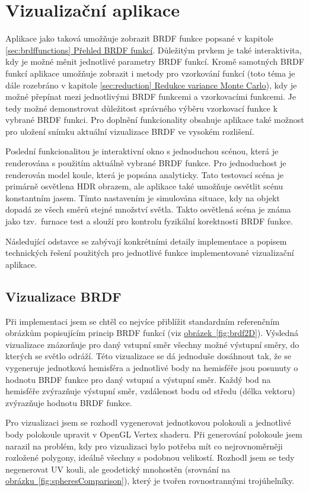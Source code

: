\documentclass[czech,master]{diploma}
\begin{document}
\chapter{Vizualizační aplikace}
Aplikace jako taková umožňuje zobrazit BRDF funkce popsané v kapitole \hyperref[sec:brdffunctions]{\ref{sec:brdffunctions} Přehled BRDF funkcí}. Důležitým prvkem je také interaktivita, kdy je možné měnit jednotlivé parametry BRDF funkcí. Kromě samotných BRDF funkcí aplikace umožňuje zobrazit i metody pro vzorkování funkcí (toto téma je dále rozebráno v kapitole \hyperref[sec:reduction]{\ref{sec:reduction} Redukce variance Monte Carlo}), kdy je možné přepínat mezi jednotlivými BRDF funkcemi a vzorkovacími funkcemi. Je tedy možné demonstrovat důležitost správného výběru vzorkovací funkce k vybrané BRDF funkci. Pro doplnění funkcionality obsahuje aplikace také možnost pro uložení snímku aktuální vizualizace BRDF ve vysokém rozlišení. \par
Poslední funkcionalitou je interaktivní okno s jednoduchou scénou, která je renderována s použitím aktuálně vybrané BRDF funkce. Pro jednoduchost je renderován model koule, která je popsána analyticky. Tato testovací scéna je primárně osvětlena HDR obrazem, ale aplikace také umožňuje osvětlit scénu konstantním jasem. Tímto nastavením je simulována situace, kdy na objekt dopadá ze všech směrů stejné množství světla. Takto osvětlená scéna je známa jako tzv.\ furnace test a slouží pro kontrolu fyzikální korektnosti BRDF funkce.\par
Následující odstavce se zabývají konkrétními detaily implementace a popisem technických řešení použitých pro jednotlivé funkce implementované vizualizační aplikace.

\section{Vizualizace BRDF}
Při implementaci jsem se chtěl co nejvíce přiblížit standardním referenčním obrázkům popisujícím princip BRDF funkcí (viz \hyperref[fig:brdf2D]{obrázek~\ref{fig:brdf2D}}). Výsledná vizualizace znázorňuje  pro daný vstupní směr všechny možné výstupní směry, do kterých se světlo odráží. Této vizualizace se dá jednoduše dosáhnout tak, že se vygeneruje jednotková hemisféra a jednotlivé body na hemisféře jsou posunuty o hodnotu BRDF funkce pro daný vstupní a výstupní směr. Každý bod na hemisféře zvýrazňuje výstupní směr, vzdálenost bodu od středu (délka vektoru) zvýrazňuje hodnotu BRDF funkce. \par
Pro vizualizaci jsem se rozhodl vygenerovat jednotkovou polokouli a jednotlivé body polokoule upravit v OpenGL Vertex shaderu. Při generování polokoule jsem narazil na problém, kdy pro vizualizaci bylo potřeba mít co nejrovnoměrněji rozložené polygony, ideálně všechny s podobnou velikostí. Rozhodl jsem se tedy negenerovat UV kouli, ale geodetický mnohostěn (srovnání na \hyperref[fig:spheresComparison]{obrázku~\ref{fig:spheresComparison}}), který je tvořen rovnostrannými trojúhelníky.  \par
\end{document}
